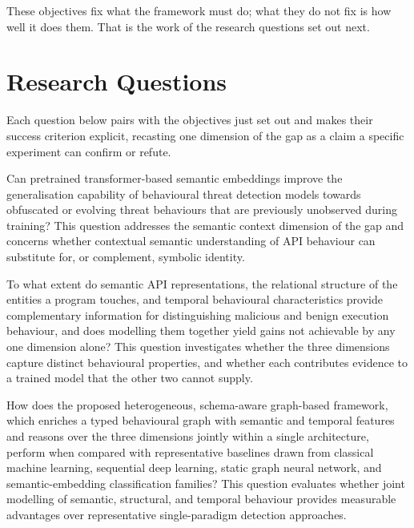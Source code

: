 \documentclass[%
    BCOR=10mm,
    DIV=13,
    toc=bibliography,
    toc=listof,
    oneside,
    12pt,
]{scrbook}
\begin{document}
These objectives fix what the framework must do; what they do not fix is how well it
does them. That is the work of the research questions set out next.

\section{Research Questions}
\label{sec:research_questions}

Each question below pairs with the objectives just set out and makes their success
criterion explicit, recasting one dimension of the gap as a claim a specific
experiment can confirm or refute.

\begin{description}[leftmargin=0pt, labelwidth=0pt, labelsep=\parskip, style=nextline]

\item[\textbf{RQ1 -- Semantic Generalisation.}]
Can pretrained transformer-based semantic embeddings improve the
generalisation capability of behavioural threat detection models towards
obfuscated or evolving threat behaviours that are previously unobserved during
training? This question addresses the semantic context dimension of the
gap and concerns whether contextual semantic understanding of API behaviour
can substitute for, or complement, symbolic identity.

\item[\textbf{RQ2 -- Complementarity of Semantic, Structural and Temporal Signals.}]
To what extent do semantic API representations, the relational structure of the
entities a program touches, and temporal behavioural characteristics provide
complementary information for distinguishing malicious and benign execution
behaviour, and does modelling them together yield gains not achievable by any
one dimension alone? This question investigates whether the three dimensions
capture distinct behavioural properties, and whether each contributes evidence
to a trained model that the other two cannot supply.

\item[\textbf{RQ3 -- End-to-End Detection Performance.}]
How does the proposed heterogeneous, schema-aware graph-based
framework, which enriches a typed behavioural graph with semantic and temporal
features and reasons over the three dimensions jointly within a single architecture,
perform when compared with representative baselines
drawn from classical machine learning, sequential deep learning, static graph
neural network, and semantic-embedding classification families? This question
evaluates whether joint modelling of semantic, structural, and temporal
behaviour provides measurable advantages over representative single-paradigm
detection approaches.


\end{description}
\end{document}
